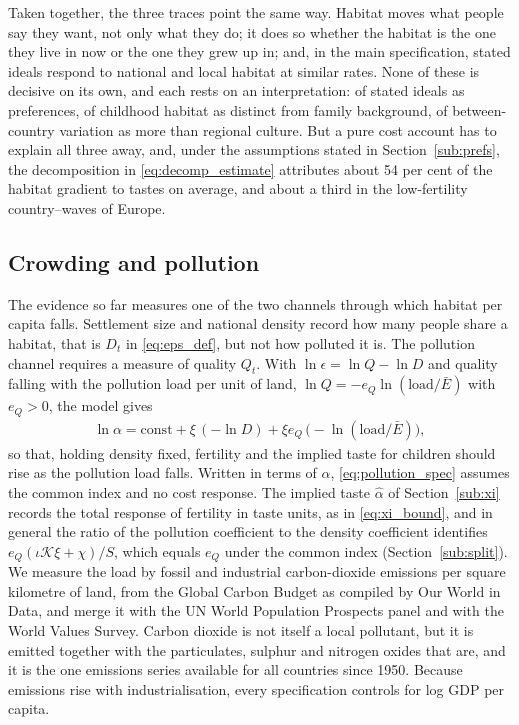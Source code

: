 \documentclass[11pt]{article}
\begin{document}
Taken together, the three traces point the same way. Habitat moves what people say they want, not
only what they do; it does so whether the habitat is the one they live in now or the one they grew
up in; and, in the main specification, stated ideals respond to national and local habitat at
similar rates. None of these is
decisive on its own, and each rests on an interpretation: of stated ideals as preferences, of
childhood habitat as distinct from family background, of between-country variation as more than
regional culture. But a pure cost account has to explain all three away, and, under the assumptions stated in Section~\ref{sub:prefs}, the decomposition in
\eqref{eq:decomp_estimate} attributes about 54 per cent of the habitat gradient to tastes on
average, and about a third in the low-fertility country--waves of Europe.

\subsection{Crowding and pollution}
\label{sub:pollution}

The evidence so far measures one of the two channels through which habitat per capita falls. Settlement
size and national density record how many people share a habitat, that is $D_t$ in
\eqref{eq:eps_def}, but not how polluted it is. The pollution channel requires a measure of quality
$Q_t$. With $\ln\epsilon=\ln Q-\ln D$ and quality falling with the pollution load per unit of land,
$\ln Q=-e_Q\ln(\text{load}/\bar E)$ with $e_Q>0$, the model gives
\begin{align}
\ln\alpha=\text{const}+\xi\,(-\ln D)+\xi e_Q\,\big(-\ln(\text{load}/\bar E)\big),
\label{eq:pollution_spec}
\end{align}
so that, holding density fixed, fertility and the implied taste for children should rise as the
pollution load falls. Written in terms of $\alpha$, \eqref{eq:pollution_spec} assumes the common index and
no cost response. The implied taste $\hat\alpha$ of Section~\ref{sub:xi} records the total response of
fertility in taste units, as in \eqref{eq:xi_bound}, and in general the ratio of the pollution
coefficient to the density coefficient identifies $e_Q(\iota\mathcal{K}\xi+\chi)/S$, which equals $e_Q$
under the common index (Section~\ref{sub:split}). We measure the load by fossil and industrial carbon-dioxide emissions per square
kilometre of land, from the Global Carbon Budget as compiled by Our World in Data, and merge it with
the UN World Population Prospects panel and with the World Values Survey. Carbon dioxide is not itself
a local pollutant, but it is emitted together with the particulates, sulphur and nitrogen oxides that
are, and it is the one emissions series available for all countries since 1950. Because emissions rise
with industrialisation, every specification controls for log GDP per capita.
\end{document}
